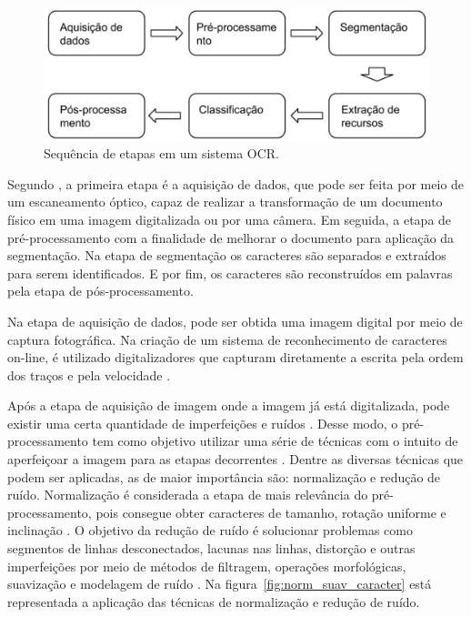 \begin{figure}[h]
	\centering
	\includegraphics[width=1.0\textwidth]{Imagens/etapasocr} 
	\caption[Sequência de etapas em um sistema OCR.]{Sequência de etapas em um sistema OCR.}
	\label{fig:etapasocr}
\end{figure}

Segundo , a primeira etapa é a aquisição de dados, que pode ser feita por meio de um escaneamento óptico, capaz de realizar a transformação de um documento físico em uma imagem digitalizada ou por uma câmera. Em seguida, a etapa de pré-processamento com a finalidade de melhorar o documento para aplicação da segmentação. Na etapa de segmentação os caracteres são separados e extraídos para serem identificados. E por fim, os caracteres são reconstruídos em palavras pela etapa de pós-processamento.

Na etapa de aquisição de dados, pode ser obtida uma imagem digital por meio de captura fotográfica. Na criação de um sistema de reconhecimento de caracteres on-line, é utilizado digitalizadores que capturam diretamente a escrita pela ordem dos traços e pela velocidade \cite{Goswami2013}.

Após a etapa de aquisição de imagem onde a imagem já está digitalizada, pode existir uma certa quantidade de imperfeições e ruídos \cite{Eikvil1993}. Desse modo, o pré-processamento tem como objetivo utilizar uma série de técnicas com o intuito de aperfeiçoar a imagem para as etapas decorrentes \cite{Goswami2013}. Dentre as diversas técnicas que podem ser aplicadas, as de maior importância são: normalização e redução de ruído. Normalização é considerada a etapa de mais relevância do pré-processamento, pois consegue obter caracteres de tamanho, rotação uniforme e inclinação \cite{Eikvil1993}. O objetivo da redução de ruído é solucionar problemas como segmentos de linhas desconectados, lacunas nas linhas, distorção e outras imperfeições por meio de métodos de filtragem, operações morfológicas, suavização e modelagem de ruído \cite{Goswami2013}. 
Na figura~\ref{fig:norm_suav_caracter} está representada a aplicação das técnicas de normalização e redução de ruído.

